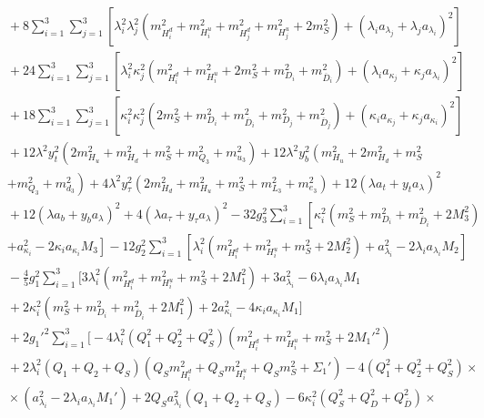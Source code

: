 \documentclass[preprint,amsmath,amssymb,aps,superscriptaddress,prd,showpacs,floatfix,nofootinbib]{revtex4-1}
\begin{document}
\begin{subequations}
\begin{align}
&{}+8\sum_{i=1}^3\sum_{j=1}^3\left [ \lambda_i^2\lambda_j^2\left ( m_{H_i^d}^2+m_{H_i^u}^2+m_{H_j^d}^2+m_{H_j^u}^2+2m_S^2\right )+\left ( \lambda_i a_{\lambda_j}+\lambda_ja_{\lambda_i}\right )^2\right ]\nonumber\\
&{}+24\sum_{i=1}^3\sum_{j=1}^3\left [ \lambda_i^2\kappa_j^2\left ( m_{H_i^d}^2+m_{H_i^u}^2+2m_S^2+m_{D_i}^2+m_{\overline{D}_i}^2\right )+\left ( \lambda_ia_{\kappa_j}+\kappa_ja_{\lambda_i}\right )^2\right ]\nonumber\\
&{}+18\sum_{i=1}^3\sum_{j=1}^3\left [ \kappa_i^2\kappa_j^2\left ( 2m_S^2+m_{D_i}^2+m_{\overline{D}_i}^2+m_{D_j}^2+m_{\overline{D}_j}^2\right )+\left ( \kappa_ia_{\kappa_j}+\kappa_ja_{\kappa_i}\right )^2\right ]\nonumber\\
&{}+12\lambda^2y_t^2\left ( 2m_{H_u}^2+m_{H_d}^2+m_S^2+m_{Q_3}^2+m_{u_3}^2\right )+12\lambda^2y_b^2\left ( m_{H_u}^2+2m_{H_d}^2+m_S^2\right.\nonumber\\
&{}\left.+m_{Q_3}^2+m_{d_3}^2\right )+4\lambda^2y_\tau^2\left ( 2m_{H_d}^2+m_{H_u}^2+m_S^2+m_{L_3}^2+m_{e_3}^2\right )+12\left ( \lambda a_t+y_ta_{\lambda}\right )^2\nonumber\\
&{}+12\left ( \lambda a_b+y_ba_{\lambda}\right )^2+4\left ( \lambda a_\tau+y_\tau a_{\lambda}\right )^2-32g_3^2\sum_{i=1}^3\left [ \kappa_i^2\left ( m_S^2+m_{D_i}^2+m_{\overline{D}_i}^2+2M_3^2\right )\right.\nonumber\\
&{}\left.+a_{\kappa_i}^2-2\kappa_ia_{\kappa_i}M_3\right ]-12g_2^2\sum_{i=1}^3\left [ \lambda_i^2\left ( m_{H_i^d}^2+m_{H_i^u}^2+m_S^2+2M_2^2\right )+a_{\lambda_i}^2-2\lambda_i a_{\lambda_i}M_2\right ]\nonumber\\
&{}-\frac{4}{5}g_1^2\sum_{i=1}^3\Big [ 3\lambda_i^2\left ( m_{H_i^d}^2+m_{H_i^u}^2+m_S^2+2M_1^2\right )+3a_{\lambda_i}^2-6\lambda_i a_{\lambda_i}M_1\nonumber\\
&{}+2\kappa_i^2\left ( m_S^2+m_{D_i}^2+m_{\overline{D}_i}^2+2M_1^2\right )+2a_{\kappa_i}^2-4\kappa_i a_{\kappa_i}M_1\Big ]\nonumber\\
&{}+2g_1'^2\sum_{i=1}^3\Big [ -4\lambda_i^2\left ( Q_1^2+Q_2^2+Q_S^2\right )\left ( m_{H_i^d}^2+m_{H_i^u}^2+m_S^2+2M_1'^2\right )\nonumber\\
&{}+2\lambda_i^2\left ( Q_1+Q_2+Q_S\right )\left ( Q_Sm_{H_i^d}^2+Q_Sm_{H_i^u}^2+Q_Sm_S^2+\Sigma_1'\right )-4\left ( Q_1^2+Q_2^2+Q_S^2\right )\times\nonumber\\
&{}\times\left ( a_{\lambda_i}^2-2\lambda_i a_{\lambda_i}M_1'\right )+2Q_Sa_{\lambda_i}^2\left ( Q_1+Q_2+Q_S\right )-6\kappa_i^2\left ( Q_S^2+Q_D^2+Q_{\overline{D}}^2\right )\times\nonumber\\

\end{align}
\end{subequations}
\end{document}
